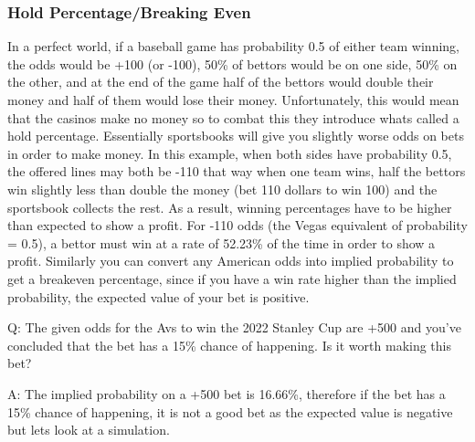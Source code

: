\documentclass[]{article}
\begin{document}
\hypertarget{hold-percentagebreaking-even}{%
\subsubsection{Hold Percentage/Breaking
Even}\label{hold-percentagebreaking-even}}

In a perfect world, if a baseball game has probability 0.5 of either
team winning, the odds would be +100 (or -100), 50\% of bettors would be
on one side, 50\% on the other, and at the end of the game half of the
bettors would double their money and half of them would lose their
money. Unfortunately, this would mean that the casinos make no money so
to combat this they introduce whats called a hold percentage.
Essentially sportsbooks will give you slightly worse odds on bets in
order to make money. In this example, when both sides have probability
0.5, the offered lines may both be -110 that way when one team wins,
half the bettors win slightly less than double the money (bet 110
dollars to win 100) and the sportsbook collects the rest. As a result,
winning percentages have to be higher than expected to show a profit.
For -110 odds (the Vegas equivalent of probability = 0.5), a bettor must
win at a rate of 52.23\% of the time in order to show a profit.
Similarly you can convert any American odds into implied probability to
get a breakeven percentage, since if you have a win rate higher than the
implied probability, the expected value of your bet is positive.

Q: The given odds for the Avs to win the 2022 Stanley Cup are +500 and
you've concluded that the bet has a 15\% chance of happening. Is it
worth making this bet?

A: The implied probability on a +500 bet is 16.66\%, therefore if the
bet has a 15\% chance of happening, it is not a good bet as the expected
value is negative but lets look at a simulation.
\end{document}
